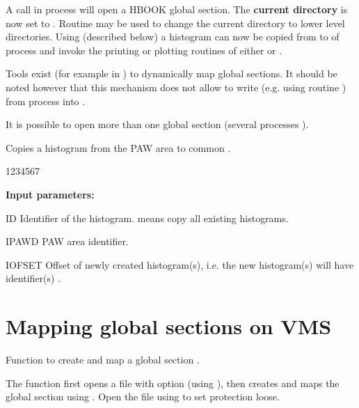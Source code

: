 A call 
in process  will open a HBOOK global section.
The {\bf current directory} is now set to .
Routine  may be used to change the current directory
to lower level directories.
Using  (described below) a histogram can now be copied
from  to  of process 
and invoke the printing or plotting routines
of either  or .
 
Tools exist
(for example in ) to dynamically map global sections.
It should be noted however that this mechanism does not allow
to write (e.g. using routine )
from process  into .
 
It is possible to open more than one global section (several processes
).



\Action Copies a histogram from the PAW area to common .
 
\begin{DLtt}{1234567}
\item[{\rm\bf Input parameters:}]
\item[ID] Identifier of the histogram.
           means copy all existing histograms.
\item[IPAWD] PAW area identifier.
\item[IOFSET] Offset of newly created histogram(s), i.e.
              the new histogram(s) will have identifier(s) .
\end{DLtt}

\newpage

\section{Mapping global sections on VMS}


\Action  Function to create and map a global section .

The function first opens a file with  option 
(using ),
then creates and maps the global section using .
Open the file using  to set protection loose.

